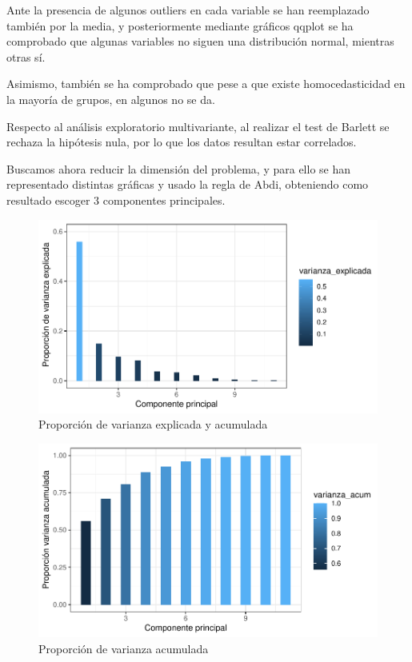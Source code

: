 \documentclass[twoside,openright,titlepage,numbers=noenddot,openany,headinclude,footinclude=true,
cleardoublepage=empty,abstractoff,BCOR=5mm,paper=a4,fontsize=12pt,main=spanish]{scrreprt}
\begin{document}
Ante la presencia de algunos outliers en cada variable se han reemplazado también por la media, y posteriormente mediante gráficos qqplot se ha comprobado que algunas variables no siguen una distribución normal, mientras otras sí.

Asimismo, también se ha comprobado que pese a que existe homocedasticidad en la mayoría de grupos, en algunos no se da.

Respecto al análisis exploratorio multivariante, al realizar el test de Barlett se rechaza la hipótesis nula, por lo que los datos resultan estar correlados.

Buscamos ahora reducir la dimensión del problema, y para ello se han representado distintas gráficas y usado la regla de Abdi, obteniendo como resultado escoger $3$ componentes principales.

\begin{figure}[H]
\includegraphics[scale=1]{varianza_explicada.pdf}
\caption{Proporción de varianza explicada y acumulada}
\label{fig: varianza_explicada}
\end{figure}

\begin{figure}[H]
\includegraphics[scale=1]{varianza_acumulada.pdf}
\caption{Proporción de varianza acumulada}
\label{fig: varianza_acumulada}
\end{figure}
\end{document}

